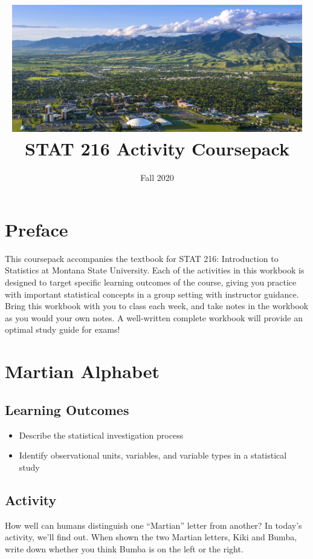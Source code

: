 \documentclass[
]{report}
\title{\includegraphics[width=5in,height=\textheight]{images/msu-campus.jpg}
\vspace{1cm}\\
STAT 216 Activity Coursepack}
\subtitle{Fall 2020}
\author{}
\date{\vspace{-2.5em}}
\begin{document}
\maketitle

{
\setcounter{tocdepth}{0}
\tableofcontents
}
\hypertarget{preface}{%
\chapter{Preface}\label{preface}}

This coursepack accompanies the textbook for STAT 216: Introduction to Statistics at Montana State University. Each of the activities in this workbook is designed to target specific learning outcomes of the course, giving you practice with important statistical concepts in a group setting with instructor guidance. Bring this workbook with you to class each week, and take notes in the workbook as you would your own notes. A well-written complete workbook will provide an optimal study guide for exams!

\hypertarget{martian-alphabet}{%
\chapter{Martian Alphabet}\label{martian-alphabet}}

\hypertarget{learning-outcomes}{%
\section{Learning Outcomes}\label{learning-outcomes}}

\begin{itemize}
\item
  Describe the statistical investigation process
\item
  Identify observational units, variables, and variable types in a statistical study
\end{itemize}

\hypertarget{activity}{%
\section{Activity}\label{activity}}

How well can humans distinguish one ``Martian'' letter from another? In today's activity, we'll find out. When shown the two Martian letters, Kiki and Bumba, write down whether you think Bumba is on the left or the right.

\vspace{0.5in}
\end{document}
